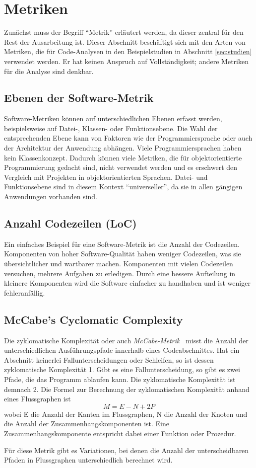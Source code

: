 \section{Metriken}
\label{sec:metriken}
Zunächst muss der Begriff "`Metrik"' erläutert werden, da dieser zentral für den Rest der Ausarbeitung ist.
Dieser Abschnitt beschäftigt sich mit den Arten von Metriken, die für Code-Analysen in den Beispielstudien in Abschnitt \ref{sec:studien} verwendet werden.
Er hat keinen Anspruch auf Vollständigkeit; andere Metriken für die Analyse sind denkbar.

\subsection{Ebenen der Software-Metrik}
Software-Metriken können auf unterschiedlichen Ebenen erfasst werden, beispielsweise auf Datei-, Klassen- oder Funktionsebene.
Die Wahl der entsprechenden Ebene kann von Faktoren wie der Programmiersprache oder auch der Architektur der Anwendung abhängen.
Viele Programmiersprachen haben kein Klassenkonzept.
Dadurch können viele Metriken, die für objektorientierte Programmierung gedacht sind, nicht verwendet werden und es erschwert den Vergleich mit Projekten in objektorientierten Sprachen.
Datei- und Funktionsebene sind in diesem Kontext "`universeller"', da sie in allen gängigen Anwendungen vorhanden sind.

\subsection{Anzahl Codezeilen (LoC)}
Ein einfaches Beispiel für eine Software-Metrik ist die Anzahl der Codezeilen.
Komponenten von hoher Software-Qualität haben weniger Codezeilen, was sie übersichtlicher und wartbarer machen.
Komponenten mit vielen Codezeilen versuchen, mehrere Aufgaben zu erledigen.
Durch eine bessere Aufteilung in kleinere Komponenten wird die Software einfacher zu handhaben und ist weniger fehleranfällig.

\subsection{McCabe's Cyclomatic Complexity}
Die zyklomatische Komplexität oder auch \emph{McCabe-Metrik}~\cite{mccabe1976} misst die Anzahl der unterschiedlichen Ausführungspfade innerhalb eines Codeabschnittes.
Hat ein Abschnitt keinerlei Fallunterscheidungen oder Schleifen, so ist dessen zyklomatische Komplexität 1.
Gibt es eine Fallunterscheidung, so gibt es zwei Pfade, die das Programm ablaufen kann.
Die zyklomatische Komplexität ist demnach 2.
Die Formel zur Berechnung der zyklomatischen Komplexität anhand eines Flussgraphen ist
\begin{equation}
	M = E - N + 2P
\end{equation}
wobei E die Anzahl der Kanten im Flussgraphen, N die Anzahl der Knoten und die Anzahl der Zusammenhangskomponenten ist.
Eine Zusammenhangskomponente entspricht dabei einer Funktion oder Prozedur.

Für diese Metrik gibt es Variationen, bei denen die Anzahl der unterscheidbaren Pfaden in Flussgraphen unterschiedlich berechnet wird.
